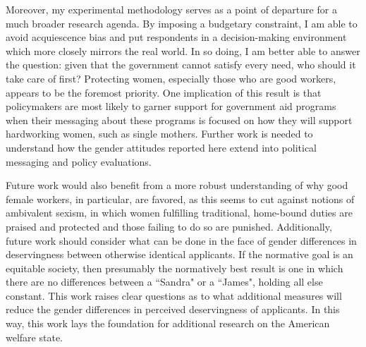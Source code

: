 \documentclass[12pt]{article}%
\begin{document}
\begin{doublespace}
Moreover, my experimental methodology serves as a point of departure for a much broader research agenda. By imposing a budgetary constraint, I am able to avoid acquiescence bias and put respondents in a decision-making environment which more closely mirrors the real world. In so doing, I am better able to answer the question: given that the government cannot satisfy every need, who should it take care of first? Protecting women, especially those who are good workers, appears to be the foremost priority. One implication of this result is that policymakers are most likely to garner support for government aid programs when their messaging about these programs is focused on how they will support hardworking women, such as single mothers. Further work is needed to understand how the gender attitudes reported here extend into political messaging and policy evaluations.

Future work would also benefit from a more robust understanding of why good female workers, in particular, are favored, as this seems to cut against notions of ambivalent sexism, in which women fulfilling traditional, home-bound duties are praised and protected and those failing to do so are punished. Additionally, future work should consider what can be done in the face of gender differences in deservingness between otherwise identical applicants. If the normative goal is an equitable society, then presumably the normatively best result is one in which there are no differences between a ``Sandra" or a ``James", holding all else constant. This work raises clear questions as to what additional measures will reduce the gender differences in perceived deservingness of applicants. In this way, this work lays the foundation for additional research on the American welfare state.

\end{doublespace}

\pagebreak


\end{document}
